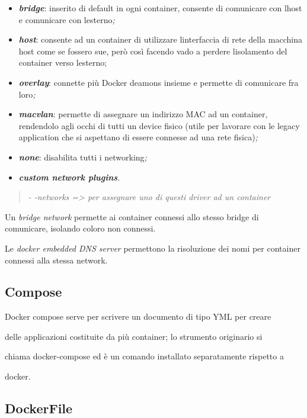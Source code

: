 \begin{itemize}
\item
  \emph{\textbf{bridge}}: inserito di default in ogni container,
  consente di comunicare con l\textquotesingle host e comunicare con
  l\textquotesingle esterno\emph{;}
\item
  \emph{\textbf{host}}: consente ad un container di utilizzare
  l\textquotesingle interfaccia di rete della macchina host come se
  fossero sue, però così facendo vado a perdere
  l\textquotesingle isolamento del container verso
  l\textquotesingle esterno;
\item
  \emph{\textbf{overlay}}: connette più Docker deamons insieme e
  permette di comunicare fra loro\emph{;}
\item
  \emph{\textbf{macvlan}}: permette di assegnare un indirizzo MAC ad un
  container, rendendolo agli occhi di tutti un device fisico (utile per
  lavorare con le legacy application che si aspettano di essere connesse
  ad una rete fisica)\emph{;}
\item
  \emph{\textbf{none}}: disabilita tutti i networking\emph{;}
\item
  \emph{\textbf{custom network plugins}}.
\end{itemize}

\begin{quote}
\emph{- -networks =\textgreater{} per assegnare uno di questi driver ad
un container}
\end{quote}

Un \emph{bridge network} permette ai container connessi allo stesso
bridge di comunicare, isolando coloro non connessi.

Le \emph{docker embedded DNS server} permettono la risoluzione dei nomi
per container connessi alla stessa network.

\subsection{Compose}\label{compose}

Docker compose serve per scrivere un documento di tipo YML per creare

delle applicazioni costituite da più container; lo strumento originario
si

chiama docker-compose ed è un comando installato separatamente rispetto
a

docker.

\subsection{DockerFile}\label{dockerfile}

